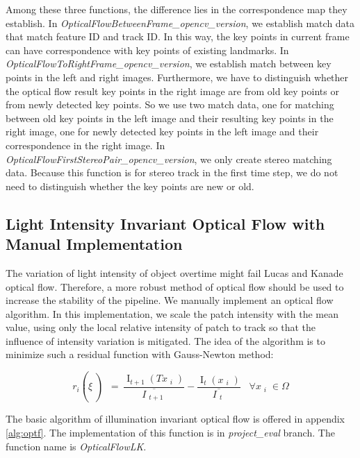 \documentclass{easychair}
\begin{document}
Among these three functions, the difference lies in the correspondence map they establish. In \emph{OpticalFlowBetweenFrame\_opencv\_version}, we establish match data that match feature ID and track ID. In this way, the key points in current frame can have correspondence with key points of existing landmarks. In \emph{OpticalFlowToRightFrame\_opencv\_version}, we establish match between key points in the left and right images. Furthermore, we have to distinguish whether the optical flow result key points in the right image are from old key points or from newly detected key points. So we use two match data, one for matching between old key points in the left image and their resulting key points in the right image, one for newly detected key points in the left image and their correspondence in the right image. In \emph{OpticalFlowFirstStereoPair\_opencv\_version}, we only create stereo matching data. Because this function is for stereo track in the first time step, we do not need to distinguish whether the key points are new or old.

\subsection{Light Intensity Invariant Optical Flow with Manual Implementation}
The variation of light intensity of object overtime might fail Lucas and Kanade optical flow. Therefore, a more robust method of optical flow should be used to increase the stability of the pipeline. We manually implement an optical flow algorithm. In this implementation, we scale the patch intensity with the mean value, using only the local relative intensity of patch to track so that the influence of intensity variation is mitigated. The idea of the algorithm is to minimize such a residual function with Gauss-Newton method\cite{basalt}:

\[{{r_i \left(  \xi  \left) \text{ }=\text{ }\frac{{\mathop{{I}}\nolimits_{{t+1}} \left( Tx\mathop{{}}\nolimits_{{i}} \right) }}{{ \overline {I\mathop{{}}\nolimits_{{t+1}}}}}\right. \right. }-\frac{{\mathop{{I}}\nolimits_{{t}} \left( x\mathop{{}}\nolimits_{{i}} \right) }}{{ \overline {I\mathop{{}}\nolimits_{{t}}}}}\text{ }\text{ }\ \ \forall x\mathop{{}}\nolimits_{{i}} \in  \Omega }\]

The basic algorithm of illumination invariant optical flow is offered in appendix \ref{alg:optf}. The implementation of this function is in \emph{project\_eval} branch. The function name is \emph{OpticalFlowLK}.
\end{document}
